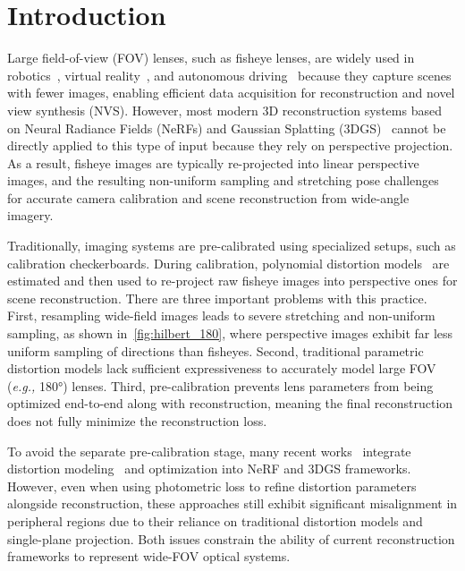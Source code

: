 \section{Introduction}
\label{sec:intro}
Large field-of-view (FOV) lenses, such as fisheye lenses, are widely used in robotics~\cite{de2018robust}, virtual reality~\cite{klanvcar2004wide}, and autonomous driving~\cite{cui2019real} because they capture scenes with fewer images, enabling efficient data acquisition for reconstruction and novel view synthesis (NVS)\cite{ma20153d}. However, most modern 3D reconstruction systems based on Neural Radiance Fields (NeRFs)\cite{mildenhall2021nerf} and Gaussian Splatting (3DGS)~\cite{kerbl20233d} cannot be directly applied to this type of input because they rely on perspective projection. As a result, fisheye images are typically re-projected into linear perspective images, and the resulting non-uniform sampling and stretching pose challenges for accurate camera calibration and scene reconstruction from wide-angle imagery.


Traditionally, imaging systems are pre-calibrated using specialized setups, such as calibration checkerboards. During calibration, polynomial distortion models~\cite{opencv_library, schoenberger2016sfm} are estimated and then used to re-project raw fisheye images into perspective ones for scene reconstruction. There are three important problems with this practice. First, resampling wide-field images leads to severe stretching and non-uniform sampling, as shown in~\cref{fig:hilbert_180}, where perspective images exhibit far less uniform sampling of directions than fisheyes. Second, traditional parametric distortion models lack sufficient expressiveness to accurately model large FOV (\textit{e.g.,} 180\si{\degree}) lenses. Third, pre-calibration prevents lens parameters from being optimized end-to-end along with reconstruction, meaning the final reconstruction does not fully minimize the reconstruction loss.

To avoid the separate pre-calibration stage, many recent works~\cite{moenne20243d, jeong2021self, liao2024fisheye} integrate distortion modeling~\cite{zeller1996camera, pollefeys1999stratified, chandraker2007autocalibration, chandraker2010globally} and optimization into NeRF and 3DGS frameworks. However, even when using photometric loss to refine distortion parameters alongside reconstruction, these approaches still exhibit significant misalignment in peripheral regions due to their reliance on traditional distortion models and single-plane projection. Both issues constrain the ability of current reconstruction frameworks to represent wide-FOV optical systems.


